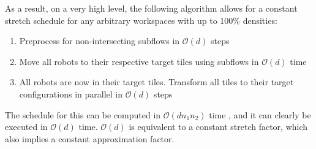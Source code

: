 As a result, on a very high level, the following algorithm allows for a constant stretch schedule for any arbitrary workspaces with up to 100\% densities: 
\begin{enumerate}
	\item Preprocess for non-intersecting subflows in \(\mathcal{O}(d)\) steps
	\item Move all robots to their respective target tiles using subflows in \(\mathcal{O}(d)\) time
	\item All robots are now in their target tiles. Transform all tiles to their target configurations in parallel in \(\mathcal{O}(d)\) steps
\end{enumerate}

The schedule for this can be computed in \(\mathcal{O}(dn_1 n_2)\) time \cite{siamcomp/DemaineFKMS19}, and it can clearly be executed in \(\mathcal{O}(d)\) time. 
\(\mathcal{O}(d)\) is equivalent to a constant stretch factor, which also implies a constant approximation factor. 

